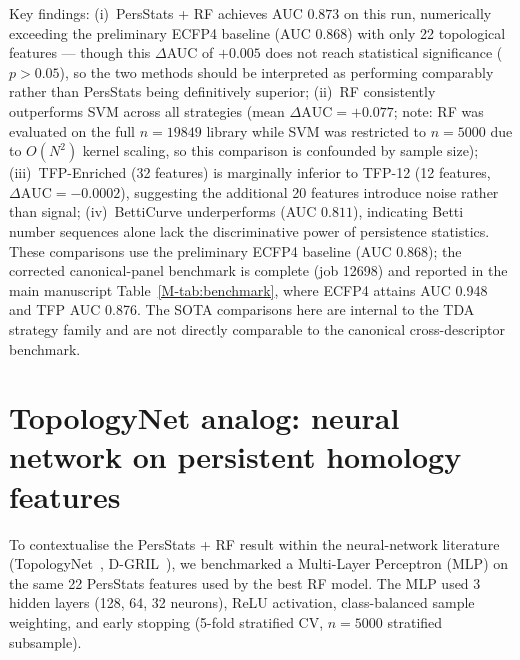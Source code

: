 \documentclass[11pt,a4paper]{article}
\begin{document}
Key findings: (i)~PersStats + RF achieves AUC $0.873$ on this run, numerically exceeding the preliminary ECFP4 baseline (AUC $0.868$) with only 22 topological features --- though this $\Delta$AUC of $+0.005$ does not reach statistical significance ($p > 0.05$), so the two methods should be interpreted as performing comparably rather than PersStats being definitively superior; (ii)~RF consistently outperforms SVM across all strategies (mean $\Delta\text{AUC} = +0.077$; note: RF was evaluated on the full $n = 19849$ library while SVM was restricted to $n = 5000$ due to $O(N^2)$ kernel scaling, so this comparison is confounded by sample size); (iii)~TFP-Enriched (32 features) is marginally inferior to TFP-12 (12 features, $\Delta\text{AUC} = -0.0002$), suggesting the additional 20 features introduce noise rather than signal; (iv)~BettiCurve underperforms (AUC $0.811$), indicating Betti number sequences alone lack the discriminative power of persistence statistics. These comparisons use the preliminary ECFP4 baseline (AUC 0.868); the corrected canonical-panel benchmark is complete (job 12698) and reported in the main manuscript Table~\cref{M-tab:benchmark}, where ECFP4 attains AUC 0.948 and TFP AUC 0.876. The SOTA comparisons here are internal to the TDA strategy family and are not directly comparable to the canonical cross-descriptor benchmark.


\section{TopologyNet analog: neural network on persistent homology features}
\label{sec:topologynet_analog}

To contextualise the PersStats + RF result within the neural-network literature (TopologyNet~\citep{topologynet_2018}, D-GRIL~\citep{dgril_2026}), we benchmarked a Multi-Layer Perceptron (MLP) on the same 22 PersStats features used by the best RF model. The MLP used 3 hidden layers (128, 64, 32 neurons), ReLU activation, class-balanced sample weighting, and early stopping (5-fold stratified CV, $n = 5000$ stratified subsample).
\end{document}
